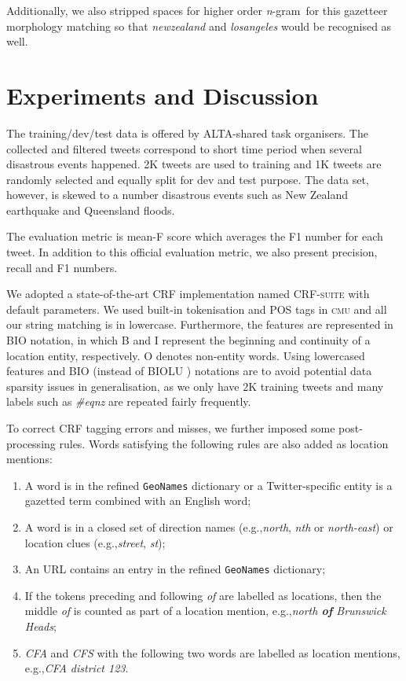 \documentclass[11pt]{article}
\newcommand{\eg}{e.g.,\xspace}
\newcommand{\geoname}{\texttt{GeoNames}\xspace}
\newcommand{\myex}[1]{\textit{#1}}
\newcommand{\method}[1]{\textsf{#1}\xspace}
\newcommand{\ngram}{\textit{n}-gram\ }
\newcommand{\cmu}{\textsc{cmu}\xspace}
\newcommand{\crfsuite}{\textsc{CRF-suite}\xspace}
\begin{document}
Additionally, we also stripped spaces for higher order \ngram for this gazetteer morphology matching so that \myex{newzealand} and \myex{losangeles} would be recognised as well.

\section{Experiments and Discussion}
\label{sec:experiment}

The training/dev/test data is offered by ALTA-shared task organisers.
The collected and filtered tweets correspond to short time period when several disastrous events happened.
2K tweets are used to training and 1K tweets are randomly selected and equally split for dev and test purpose.
The data set, however, is skewed to a number disastrous events such as New Zealand earthquake and Queensland floods.

The evaluation metric is mean-F score which averages the F1 number for each tweet.
In addition to this official evaluation metric, we also present precision, recall and F1 numbers.

We adopted a state-of-the-art CRF implementation named \crfsuite \cite{crfsuite} with default parameters.
We used built-in tokenisation and POS tags in \cmu and all our string matching is in lowercase.
Furthermore, the features are represented in \method{BIO} notation, in which \method{B} and \method{I} represent the beginning and continuity of a location entity, respectively.
\method{O} denotes non-entity words.
Using lowercased features and \method{BIO} (instead of \method{BIOLU} \cite{conll09rati}) notations are to avoid potential data sparsity issues in generalisation, as we only have 2K training tweets and many labels such as \myex{\#eqnz} are repeated fairly frequently.

To correct CRF tagging errors and misses, we further imposed some post-processing rules.
Words satisfying the following rules are also added as location mentions:

\begin{enumerate}
\item A word is in the refined \geoname dictionary or a Twitter-specific entity is a gazetted term combined with an English word;
\item A word is in a closed set of direction names (\eg \myex{north}, \myex{nth} or \myex{north-east}) or location clues (\eg \myex{street}, \myex{st});
\item An URL contains an entry in the refined \geoname dictionary;
\item If the tokens preceding and following \myex{of} are labelled as locations, then the middle \myex{of} is counted as part of a location mention, \eg \myex{north \textbf{of} Brunswick Heads};
\item \myex{CFA} and \myex{CFS} with the following two words are labelled as location mentions, \eg \myex{CFA district 123}.
\end{enumerate}
\end{document}
